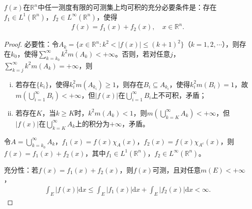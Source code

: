 \documentclass[../../main.tex]{subfiles}%
\begin{document}
\begin{example}
$f(x)$在$\mathbb{R}^n$中任一测度有限的可测集上均可积的充分必要条件是：存在$f_1\in L^1(\mathbb{R}^n)$，$f_2\in L^\infty(\mathbb{R}^n)$，使得
\begin{align*}
f(x)=f_1(x)+f_2(x),\quad x\in\mathbb{R}^n.
\end{align*}
\end{example}
\begin{proof}

{\heiti 必要性：}令$A_k=\{x\in\mathbb{R}^n:k^2<|f(x)|\leqslant(k+1)^2\}$（$k=1,2,\cdots$），则存在$k_0$，使得$\sum\limits_{k=k_0}^\infty k^2m(A_k)<+\infty$。否则，若对任意$j$，$\sum\limits_{k=j}^\infty k^2m(A_k)=+\infty$，则
\begin{enumerate}[(i)]
\item 若存在$\{k_i\}$，使得$k_i^2m(A_{k_i})\geqslant1$，则存在$B_i\subseteq A_{k_i}$，使得$k_i^2m(B_i)=1$，故$m\left(\bigcup\limits_{i=1}^\infty B_i\right)<+\infty$，但$|f(x)|$在$\bigcup\limits_{i=1}^\infty B_i$上不可积，矛盾；
\item 若存在$K$，当$k\geqslant K$时，$k^2m(A_k)<1$，则$m\left(\bigcup\limits_{k=K}^\infty A_k\right)<+\infty$，但$|f(x)|$在$\bigcup\limits_{k=K}^\infty A_k$上的积分为$+\infty$，矛盾。
\end{enumerate}

令$A=\bigcup\limits_{k=k_0}^\infty A_k$，$f_1(x)=f(x)\chi_A(x)$，$f_2(x)=f(x)\chi_{A^c}(x)$，则$f(x)=f_1(x)+f_2(x)$，其中$f_1\in L^1(\mathbb{R}^n)$，$f_2\in L^\infty(\mathbb{R}^n)$。

{\heiti 充分性：}若$f(x)=f_1(x)+f_2(x)$，则$f(x)$可测，且对任意$m(E)<+\infty$，
\begin{align*}
\int_E|f(x)|\mathrm{d}x\leqslant\int_E|f_1(x)|\mathrm{d}x+\int_E|f_2(x)|\mathrm{d}x<\infty.
\end{align*}
\end{proof}
\end{document}
